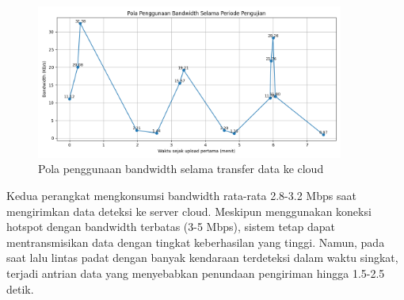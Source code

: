 \begin{figure}[htbp]
  \centering
  \includegraphics[width=0.9\textwidth]{gambar/bab4-bandwidth.png}
  \caption{Pola penggunaan bandwidth selama transfer data ke cloud}
  \label{fig:bandwidth_usage}
\end{figure}

Kedua perangkat mengkonsumsi bandwidth rata-rata 2.8-3.2 Mbps saat mengirimkan data deteksi ke server cloud. Meskipun menggunakan koneksi hotspot dengan bandwidth terbatas (3-5 Mbps), sistem tetap dapat mentransmisikan data dengan tingkat keberhasilan yang tinggi. Namun, pada saat lalu lintas padat dengan banyak kendaraan terdeteksi dalam waktu singkat, terjadi antrian data yang menyebabkan penundaan pengiriman hingga 1.5-2.5 detik.




